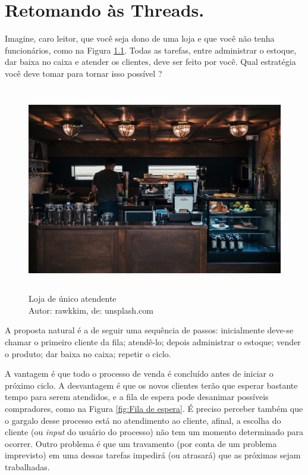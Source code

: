 





\hypertarget{Introdução.}{%
\chapter{Retomando às Threads.}\label{Retomando às Threads.}}




Imagine, caro leitor, que você seja dono de uma loja e que você não
tenha funcionários, como na Figura \ref{fig:Loja de único atendente}. Todas as tarefas, entre
administrar o estoque, dar baixa no caixa e atender os clientes, deve
ser feito por você. Qual estratégia você deve tomar para tornar isso
possível ?

\begin{figure}[h!]
\centering
\includegraphics[keepaspectratio, width=12cm, height=9cm]{imagens/06/06 - single worker store.jpg}
\caption{Loja de único atendente   \\
Autor: rawkkim, de: unsplash.com \\}
\label{fig:Loja de único atendente}
\end{figure}

A proposta natural é a de seguir uma sequência de passos: inicialmente
deve-se chamar o primeiro cliente da fila; atendê-lo; depois administrar
o estoque; vender o produto; dar baixa no caixa; repetir o ciclo.

A vantagem é que todo o processo de venda é concluído antes de iniciar o
próximo ciclo. A desvantagem é que os novos clientes terão que esperar
bastante tempo para serem atendidos, e a fila de espera pode desanimar
possíveis compradores, como na Figura \ref{fig:Fila de espera}. É preciso perceber também que o gargalo desse processo está no atendimento ao cliente, afinal, a escolha
do cliente (ou \emph{input} do usuário do processo) não tem um momento
determinado para ocorrer. Outro problema é que um travamento (por conta
de um problema imprevisto) em uma dessas tarefas impedirá (ou atrasará)
que as próximas sejam trabalhadas.


